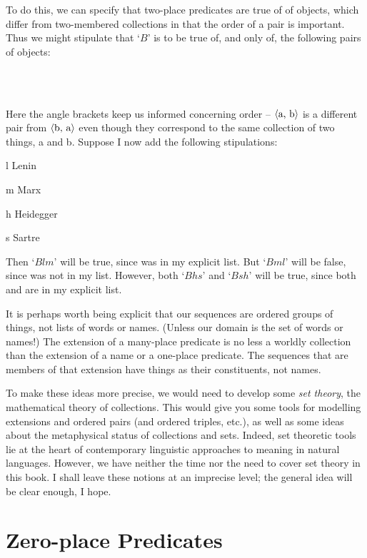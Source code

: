 To do this, we can specify that two-place predicates are true of  of objects, which differ from two-membered collections in that the order of a pair is important. Thus we might stipulate that `$B$' is to be true of, and only of, the following pairs of objects:
	\begin{center}
		\\
		\\
	\end{center}
Here the angle brackets keep us informed concerning order – $\mbox{\ensuremath{\mathopen{\langle}}a, b\ensuremath{\mathclose{\rangle}}}$ is a different pair from $\mbox{\ensuremath{\mathopen{\langle}}b, a\ensuremath{\mathclose{\rangle}}}$ even though they correspond to the same collection of two things, a and b. Suppose I now add the following stipulations:
	\begin{ekey}
		\item[l] Lenin
		\item[m] Marx
		\item[h] Heidegger
		\item[s] Sartre
	\end{ekey}
Then `$Blm$' will be true, since  was in my explicit list. But `$Bml$' will be false, since  was not in my list. However, both `$Bhs$' and `$Bsh$' will be true, since both  and  are in my explicit list. 

It is perhaps worth being explicit that our sequences are ordered groups of things, not lists of words or names. (Unless our domain is the set of words or names!) The extension of a many-place predicate is no less a worldly collection than the extension of a name or a one-place predicate. The sequences that are members of that extension have things as their constituents, not names.

To make these ideas more precise, we would need to develop some \emph{set theory}, the mathematical theory of collections. This would give you some tools for modelling extensions and ordered pairs (and ordered triples, etc.), as well as some ideas about the metaphysical status of collections and sets. Indeed, set theoretic tools lie at the heart of contemporary linguistic approaches to meaning in natural languages. However, we have neither the time nor the need to cover set theory in this book. I shall leave these notions at an imprecise level; the general idea will be clear enough, I hope. 

\section{Zero-place Predicates} \label{s:zpp}

